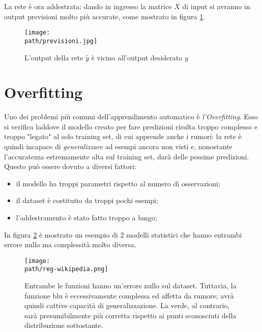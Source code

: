 La rete è ora addestrata: dando in ingresso la matrice $X$ di input si avranno in output previsioni molto più accurate, come mostrato in figura \ref{fig:previsioni}. 
\begin{figure}[h!]
 \centering
 \texttt{[image: \\path/previsioni.jpg]}
 \caption{L'output della rete $\hat{y}$ è vicino all'output desiderato $y$}
 \label{fig:previsioni}
\end{figure}

\section{Overfitting}
Uno dei problemi più comuni dell'apprendimento automatico è \emph{l'Overfitting}. Esso si verifica laddove il modello creato per fare predizioni risulta troppo complesso e troppo "legato" al solo training set, di cui apprende anche i rumori: la rete è quindi incapace di \emph{generalizzare} ad esempi ancora non visti e, nonostante l'accuratezza estremamente alta sul training set, darà delle pessime predizioni. Questo può essere dovuto a diversi fattori: 
\begin{itemize}
\item il modello ha troppi parametri rispetto al numero di osservazioni; 
\item il dataset è costituito da troppi pochi esempi; 
\item l'addestramento è stato fatto troppo a lungo;
\end{itemize}

In figura \ref{fig:regularization} è mostrato un esempio di 2 modelli statistici che hanno entrambi errore nullo ma complessità molto diversa. 
\begin{figure}[h!]
 \centering
 \texttt{[image: \\path/reg-wikipedia.png]}
 \caption{Entrambe le funzioni hanno un'errore nullo sul dataset. Tuttavia, la funzione blu è eccessivamente complessa ed affetta da rumore; avrà quindi cattive capacità di generalizzazione. La verde, al contrario, sarà presumibilmente più corretta rispetto ai punti sconosciuti della distribuzione sottostante.}
 \label{fig:regularization}
\end{figure}

